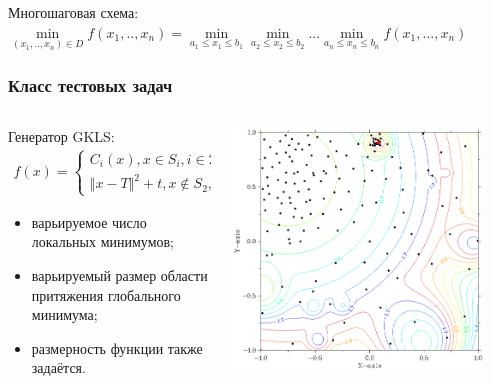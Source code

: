 \documentclass[aspectratio=169]{beamer}
\begin{document}
\begin{frame}
\begin{columns}
\begin{column}{0.5\textwidth}
\begin{figure}[ht]
      \end{figure}
    \end{column}
  \end{columns}
  Многошаговая схема:
  \(\min\limits_{(x_1,..,x_n)\in D} f(x_1,..,x_n)=\min\limits_{a_1\leqslant x_1\leqslant b_1}\min\limits_{a_2\leqslant x_2\leqslant b_2}...\min\limits_{a_n\leqslant x_n\leqslant b_n} f(x_1,...,x_n)\)
\end{frame}

\begin{frame}
  \frametitle{Класс тестовых задач}
  \begin{columns}
    \begin{column}{0.5\textwidth}
      Генератор GKLS:
      \begin{displaymath}
        \begin{matrix}
          f(x)=
          \left\{
          \begin{matrix}
          C_i(x), x \in S_i, i\in 2,\dots ,m \\
          \Vert x-T \Vert^2 + t, x\not\in S_2,\dots,S_m
          \end{matrix} \right.
        \end{matrix}
      \end{displaymath}

      \begin{itemize}
        \item варьируемое число локальных минимумов;
        \item варьируемый размер области притяжения глобального минимума;
        \item размерность функции также задаётся.
      \end{itemize}
    \end{column}
    \begin{column}{0.5\textwidth}
      \centerline{\includegraphics[width=0.9\textwidth]{gkls_color.png}}
    \end{column}
  \end{columns}
\end{frame}
\end{document}
